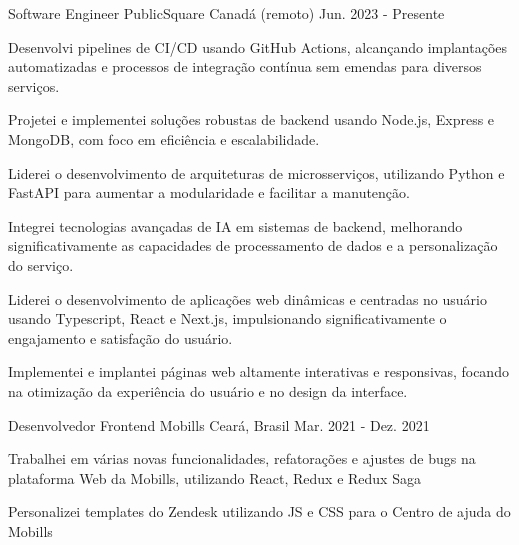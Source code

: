 

\begin{cventries}

\cventry
{Software Engineer} %
{PublicSquare} %
{Canadá (remoto)} %
{Jun. 2023 - Presente} %
{
  \begin{cvitems} %
    \item {Desenvolvi pipelines de CI/CD usando GitHub Actions, alcançando implantações automatizadas e processos de integração contínua sem emendas para diversos serviços.}
    \item {Projetei e implementei soluções robustas de backend usando Node.js, Express e MongoDB, com foco em eficiência e escalabilidade.}
    \item {Liderei o desenvolvimento de arquiteturas de microsserviços, utilizando Python e FastAPI para aumentar a modularidade e facilitar a manutenção.}
    \item {Integrei tecnologias avançadas de IA em sistemas de backend, melhorando significativamente as capacidades de processamento de dados e a personalização do serviço.}
    \item {Liderei o desenvolvimento de aplicações web dinâmicas e centradas no usuário usando Typescript, React e Next.js, impulsionando significativamente o engajamento e satisfação do usuário.}
    \item {Implementei e implantei páginas web altamente interativas e responsivas, focando na otimização da experiência do usuário e no design da interface.}
  \end{cvitems}
}




\cventry
{Desenvolvedor Frontend} %
{Mobills} %
{Ceará, Brasil} %
{Mar. 2021 - Dez. 2021} %
{
  \begin{cvitems} %
    \item {Trabalhei em várias novas
    funcionalidades, refatorações e
    ajustes de bugs na plataforma Web
    da Mobills, utilizando React,
    Redux e Redux Saga}
    \item {Personalizei templates do Zendesk
    utilizando JS e CSS para o Centro
    de ajuda do Mobills}
  \end{cvitems}
}


\end{cventries}
